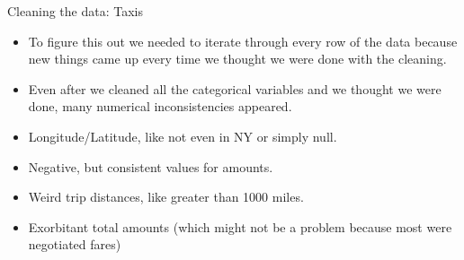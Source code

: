 \documentclass[10pt,ignorenonframetext,]{beamer}
\providecommand{\tightlist}{%
  \setlength{\itemsep}{0pt}\setlength{\parskip}{0pt}}
\begin{document}
\begin{frame}

\begin{block}{Cleaning the data: Taxis}

\begin{itemize}[<+->]
\tightlist
\item
  To figure this out we needed to iterate through every row of the data
  because new things came up every time we thought we were done with the
  cleaning.
\item
  Even after we cleaned all the categorical variables and we thought we
  were done, many numerical inconsistencies appeared.
\item
  Longitude/Latitude, like not even in NY or simply null.
\item
  Negative, but consistent values for amounts.
\item
  Weird trip distances, like greater than 1000 miles.
\item
  Exorbitant total amounts (which might not be a problem because most
  were negotiated fares)
\end{itemize}

\end{block}

\end{frame}
\end{document}
